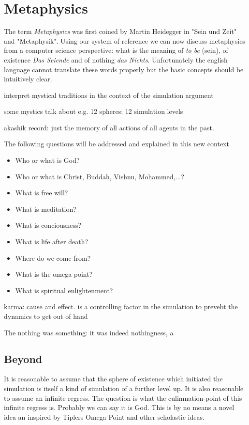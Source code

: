 \section{Metaphysics}
The term \textit{Metaphysics} was first coined by Martin Heidegger in "Sein und Zeit" and "Metaphysik". Using our system of reference we can now discuss metaphysics from a computer science perspective: what is the meaning of \textit{to be} (sein), of existence \textit{Das Seiende} and of nothing \textit{das Nichts}. Unfortunately the english language cannot translate these words properly but the basic concepts should be intuitively clear.

interpret mystical traditions in the context of the simulation argument

some mystics talk about e.g. 12 spheres: 12 simulation levels

akashik record: just the memory of all actions of all agents in the past.

The following questions will be addressed and explained in this new context

\begin{itemize}
\item Who or what is God?
\item Who or what is Christ, Buddah, Vishnu, Mohammed,...?
\item What is free will? 
\item What is meditation?
\item What is conciousness?
\item What is life after death?
\item Where do we come from?
\item What is the omega point?
\item What is spiritual enlightenment?
\end{itemize}

karma: cause and effect. is a controlling factor in the simulation to prevebt the dynamics to get out of hand

The nothing was something: it was indeed nothingness, a

\subsection{Beyond}
It is reasonable to assume that the sphere of existence which initiated the simulation is itself a kind of simulation of a further level up. It is also reasonable to assume an infinite regress. The question is what the culimnation-point of this infinite regress is. Probably we can say it is God. This is by no means a novel idea an inspired by Tiplers Omega Point and other scholastic ideas.